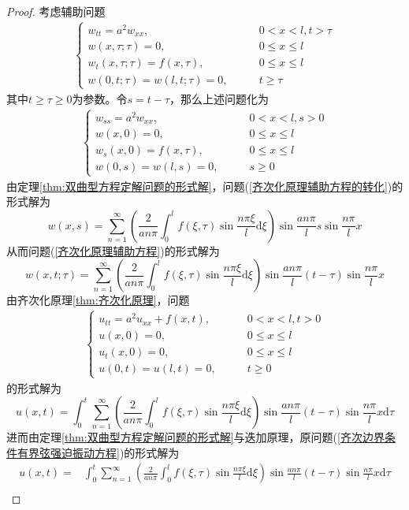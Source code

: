 \documentclass[lang = cn, scheme = chinese, thmcnt = section]{elegantbook}
\newcommand{\dd}{\mathrm{d}}           %
\begin{document}
\begin{proof}
	考虑辅助问题
	\begin{align*}\label{齐次化原理辅助方程}
		\begin{cases}
			w_{tt}=a^2w_{xx},\qquad & 0<x<l,t> \tau\\
			w(x,\tau;\tau)=0,\qquad & 0\le x \le l\\
			w_t(x,\tau;\tau)=f(x,\tau),\qquad & 0\le x \le l\\
			w(0,t;\tau)=w(l,t;\tau)=0,\qquad & t\ge \tau
		\end{cases}\tag{**}
	\end{align*}
	其中$t\ge \tau\ge 0$为参数。令$s=t-\tau$，那么上述问题化为
	\begin{align*}\label{齐次化原理辅助方程的转化}
		\begin{cases}
			w_{ss}=a^2w_{xx},\qquad & 0<x<l,s>0\\
			w(x,0)=0,\qquad & 0\le x \le l\\
			w_s(x,0)=f(x,\tau),\qquad & 0\le x \le l\\
			w(0,s)=w(l,s)=0,\qquad & s\ge 0
		\end{cases}\tag{***}
	\end{align*}
	由定理\ref{thm:双曲型方程定解问题的形式解}，问题(\ref{齐次化原理辅助方程的转化})的形式解为
	$$
	w(x,s)=\sum_{n=1}^{\infty}\left(\frac{2}{an\pi}\int_0^lf(\xi,\tau)\sin\frac{n\pi \xi}{l}\dd \xi\right)\sin \frac{an\pi}{l}s\sin\frac{n\pi}{l}x
	$$
	从而问题(\ref{齐次化原理辅助方程})的形式解为
	$$
	w(x,t;\tau)=\sum_{n=1}^{\infty}\left(\frac{2}{an\pi}\int_0^lf(\xi,\tau)\sin\frac{n\pi \xi}{l}\dd \xi\right)\sin \frac{an\pi}{l}(t-\tau)\sin\frac{n\pi}{l}x
	$$
	由齐次化原理\ref{thm:齐次化原理}，问题
	\begin{align*}
		\begin{cases}
			u_{tt}=a^2u_{xx}+f(x,t),\qquad & 0<x<l,t>0\\
			u(x,0)=0,\qquad & 0\le x \le l\\
			u_t(x,0)=0,\qquad & 0\le x \le l\\
			u(0,t)=u(l,t)=0,\qquad & t\ge 0
		\end{cases}
	\end{align*}
	的形式解为
	$$
	u(x,t)=\int_{0}^{t}\sum_{n=1}^{\infty}\left(\frac{2}{an\pi}\int_0^lf(\xi,\tau)\sin\frac{n\pi \xi}{l}\dd \xi\right)\sin \frac{an\pi}{l}(t-\tau)\sin\frac{n\pi}{l}x\dd \tau
	$$
	进而由定理\ref{thm:双曲型方程定解问题的形式解}与迭加原理，原问题(\ref{齐次边界条件有界弦强迫振动方程})的形式解为
	\begin{align*}
		u(x,t)
		= & \int_{0}^{t}\sum_{n=1}^{\infty}\left(\frac{2}{an\pi}\int_0^lf(\xi,\tau)\sin\frac{n\pi \xi}{l}\dd \xi\right)\sin \frac{an\pi}{l}(t-\tau)\sin\frac{n\pi}{l}x\dd \tau\\

\end{align*}
\end{proof}
\end{document}
